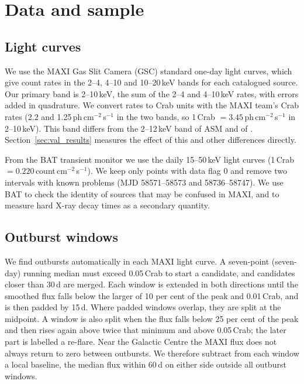 \documentclass[fleqn,usenatbib]{mnras}
\begin{document}
\section{Data and sample}
\label{sec:data}

\subsection{Light curves}
\label{sec:lc}

We use the MAXI Gas Slit Camera (GSC) standard one-day light curves, which give count rates in the 2--4, 4--10 and 10--20\,keV bands for each catalogued source. Our primary band is 2--10\,keV, the sum of the 2--4 and 4--10\,keV rates, with errors added in quadrature. We convert rates to Crab units with the MAXI team's Crab rates (2.2 and 1.25\,ph\,cm$^{-2}$\,s$^{-1}$ in the two bands, so 1\,Crab $=3.45$\,ph\,cm$^{-2}$\,s$^{-1}$ in 2--10\,keV). This band differs from the 2--12\,keV band of ASM and of \citet{Saraswati2025}. Section~\ref{sec:val_results} measures the effect of this and other differences directly.

From the BAT transient monitor we use the daily 15--50\,keV light curves (1\,Crab $=0.220$\,count\,cm$^{-2}$\,s$^{-1}$). We keep only points with data flag 0 and remove two intervals with known problems (MJD 58571--58573 and 58736--58747). We use BAT to check the identity of sources that may be confused in MAXI, and to measure hard X-ray decay times as a secondary quantity.

\subsection{Outburst windows}
\label{sec:windows}

We find outbursts automatically in each MAXI light curve. A seven-point (seven-day) running median must exceed 0.05\,Crab to start a candidate, and candidates closer than 30\,d are merged. Each window is extended in both directions until the smoothed flux falls below the larger of 10 per cent of the peak and 0.01\,Crab, and is then padded by 15\,d. Where padded windows overlap, they are split at the midpoint. A window is also split when the flux falls below 25 per cent of the peak and then rises again above twice that minimum and above 0.05\,Crab; the later part is labelled a re-flare. Near the Galactic Centre the MAXI flux does not always return to zero between outbursts. We therefore subtract from each window a local baseline, the median flux within 60\,d on either side outside all outburst windows.
\end{document}
